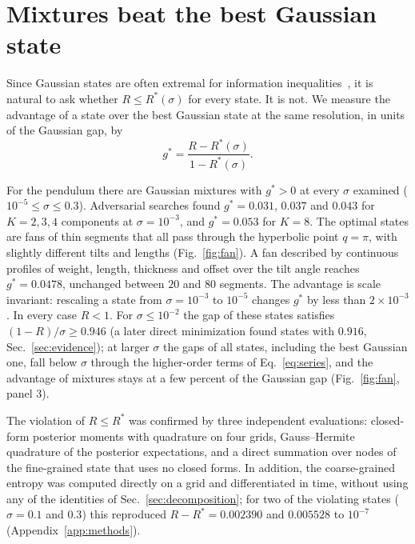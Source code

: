 \section{Mixtures beat the best Gaussian state}
\label{sec:mixtures}

Since Gaussian states are often extremal for information inequalities~\cite{stam1959,cover2006}, it is natural to ask whether $R \leq R^*(\sigma)$ for every state. It is not. We measure the advantage of a state over the best Gaussian state at the same resolution, in units of the Gaussian gap, by
\begin{equation}
g^* = \frac{R - R^*(\sigma)}{1 - R^*(\sigma)} .
\label{eq:gstar}
\end{equation}

\begin{observation}
\label{obs:fan}
For the pendulum there are Gaussian mixtures with $g^* > 0$ at every $\sigma$ examined ($10^{-5} \leq \sigma \leq 0.3$). Adversarial searches found $g^* = 0.031$, $0.037$ and $0.043$ for $K = 2, 3, 4$ components at $\sigma = 10^{-3}$, and $g^* = 0.053$ for $K = 8$. The optimal states are fans of thin segments that all pass through the hyperbolic point $q = \pi$, with slightly different tilts and lengths (Fig.~\ref{fig:fan}). A fan described by continuous profiles of weight, length, thickness and offset over the tilt angle reaches $g^* = 0.0478$, unchanged between $20$ and $80$ segments. The advantage is scale invariant: rescaling a state from $\sigma = 10^{-3}$ to $10^{-5}$ changes $g^*$ by less than $2\times10^{-3}$. In every case $R < 1$. For $\sigma \leq 10^{-2}$ the gap of these states satisfies $(1-R)/\sigma \geq 0.946$ (a later direct minimization found states with $0.916$, Sec.~\ref{sec:evidence}); at larger $\sigma$ the gaps of all states, including the best Gaussian one, fall below $\sigma$ through the higher-order terms of Eq.~\eqref{eq:series}, and the advantage of mixtures stays at a few percent of the Gaussian gap (Fig.~\ref{fig:fan}, panel 3).
\end{observation}

The violation of $R \leq R^*$ was confirmed by three independent evaluations: closed-form posterior moments with quadrature on four grids, Gauss--Hermite quadrature of the posterior expectations, and a direct summation over nodes of the fine-grained state that uses no closed forms. In addition, the coarse-grained entropy was computed directly on a grid and differentiated in time, without using any of the identities of Sec.~\ref{sec:decomposition}; for two of the violating states ($\sigma = 0.1$ and $0.3$) this reproduced $R - R^* = 0.002390$ and $0.005528$ to $10^{-7}$ (Appendix~\ref{app:methods}).

